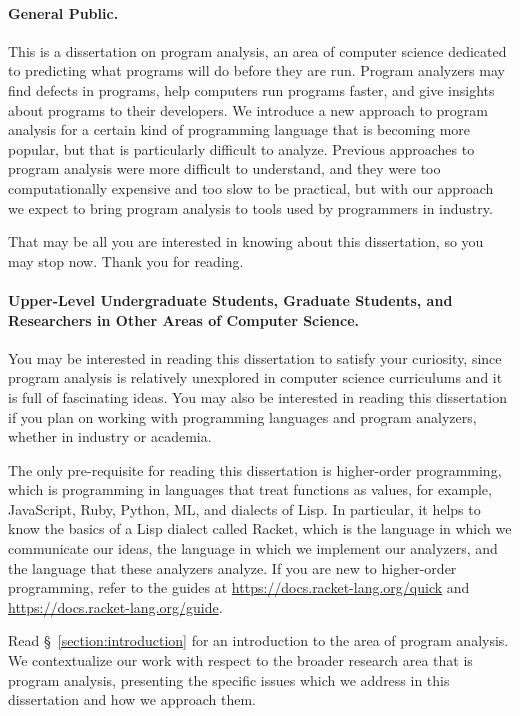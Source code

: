 \documentclass[12pt, oneside]{book}
\begin{document}
\paragraph{General Public.}

This is a dissertation on program analysis, an area of computer science dedicated to predicting what programs will do before they are run. Program analyzers may find defects in programs, help computers run programs faster, and give insights about programs to their developers. We introduce a new approach to program analysis for a certain kind of programming language that is becoming more popular, but that is particularly difficult to analyze. Previous approaches to program analysis were more difficult to understand, and they were too computationally expensive and too slow to be practical, but with our approach we expect to bring program analysis to tools used by programmers in industry.

That may be all you are interested in knowing about this dissertation, so you may stop now. Thank you for reading.

\paragraph{Upper-Level Undergraduate Students, Graduate Students, and Researchers in Other Areas of Computer Science.}

You may be interested in reading this dissertation to satisfy your curiosity, since program analysis is relatively unexplored in computer science curriculums and it is full of fascinating ideas. You may also be interested in reading this dissertation if you plan on working with programming languages and program analyzers, whether in industry or academia.

The only pre-requisite for reading this dissertation is higher-order programming, which is programming in languages that treat functions as values, for example, JavaScript, Ruby, Python, ML, and dialects of Lisp. In particular, it helps to know the basics of a Lisp dialect called Racket, which is the language in which we communicate our ideas, the language in which we implement our analyzers, and the language that these analyzers analyze. If you are new to higher-order programming, refer to the guides at \url{https://docs.racket-lang.org/quick} and \url{https://docs.racket-lang.org/guide}.

Read §~\ref{section:introduction} for an introduction to the area of program analysis. We contextualize our work with respect to the broader research area that is program analysis, presenting the specific issues which we address in this dissertation and how we approach them.
\end{document}
